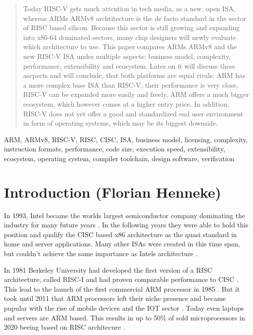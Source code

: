 \documentclass[conference]{IEEEtran}
\begin{document}
\renewcommand{\abstractname}{Abstract (Florian Henneke)}
\begin{abstract}
	Today RISC-V gets much attention in tech media, as a new, open \gls{ISA}, whereas ARMs ARMv8 archtitecture is the de facto standard in the sector of \gls{RISC} based silicon. Because this sector is still growing and expanding into x86-64 dominated sectors, many chip designers will newly evaluate which architecture to use. This paper compares ARMs ARMv8 and the new RISC-V \gls{ISA} under multiple aspects: business model, complexity, performance, extensibility and ecosystem. Later on it will discuss these ascpects and will conclude, that both platforms are equal rivals: ARM has a more complex base \gls{ISA} than RISC-V, their performance is very close, RISC-V can be expanded more easily and freely, ARM offers a much bigger ecosystem, which however comes at a higher entry price. In addition, RISC-V does not yet offer a good and standardized end user environment in form of operating systems, which may be its biggest downside.
\end{abstract}

\begin{IEEEkeywords}
ARM, ARMv8, RISC-V, RISC, CISC, ISA, business model, licensing, complexity, instruction formats, performance, code size, execution speed, extensibility, ecosystem, operating system, compiler toolchain, design software, verification
\end{IEEEkeywords}

\section{Introduction (Florian Henneke)}
\label{ref:introduction}
	In 1993, Intel became the worlds largest semiconductor company \cite{ICInsights2011} dominating the industry for many future years \cite{Blem2013}. In the following years they were able to hold this position and qualify the \gls{CISC} based x86 architecture as the quasi standard in home and server applications. Many other \glspl{ISA} were created in this time span, but couldn't achieve the same importance as Intels architecture \cite[page 3-14]{Waterman2016}. 
	
	In 1981 Berkeley University had developed the first version of a \gls{RISC} architecture, called RISC-I and had proven comparable performance to \gls{CISC} \cite[page 2f]{Ryzhyk2006}. This lead to the launch of the first commercial ARM processor in 1985 \cite[page 2f]{Ryzhyk2006}. But it took until 2011 that ARM processors left their niche presence and became pupular with the rise of mobile devices and the IOT sector \cite[Qualcomm representing the rise of ARM silicon]{ICInsights2011a}\cite{ICInsights2012}. Today even laptops \cite{Apple2020} and servers \cite{ARMN1} are ARM based. This results in up to 50\% of sold microprocessors in 2020 beeing based on RISC architecure \cite{ICInsights2020}.
\end{document}
